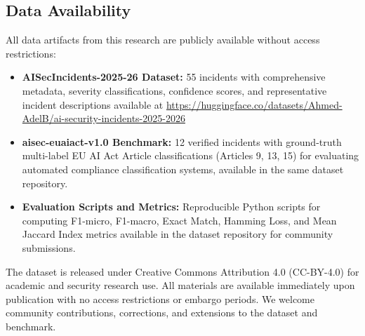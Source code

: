 \documentclass[10pt,conference]{IEEEtran}
\begin{document}
\subsection{Data Availability}

All data artifacts from this research are publicly available without access restrictions:

\begin{itemize}
    \item \textbf{AISecIncidents-2025-26 Dataset:} 55 incidents with comprehensive metadata, severity classifications, confidence scores, and representative incident descriptions available at \url{https://huggingface.co/datasets/Ahmed-AdelB/ai-security-incidents-2025-2026}

    \item \textbf{aisec-euaiact-v1.0 Benchmark:} 12 verified incidents with ground-truth multi-label EU AI Act Article classifications (Articles 9, 13, 15) for evaluating automated compliance classification systems, available in the same dataset repository.

    \item \textbf{Evaluation Scripts and Metrics:} Reproducible Python scripts for computing F1-micro, F1-macro, Exact Match, Hamming Loss, and Mean Jaccard Index metrics available in the dataset repository for community submissions.
\end{itemize}

The dataset is released under Creative Commons Attribution 4.0 (CC-BY-4.0) for academic and security research use. All materials are available immediately upon publication with no access restrictions or embargo periods. We welcome community contributions, corrections, and extensions to the dataset and benchmark.



\end{document}
